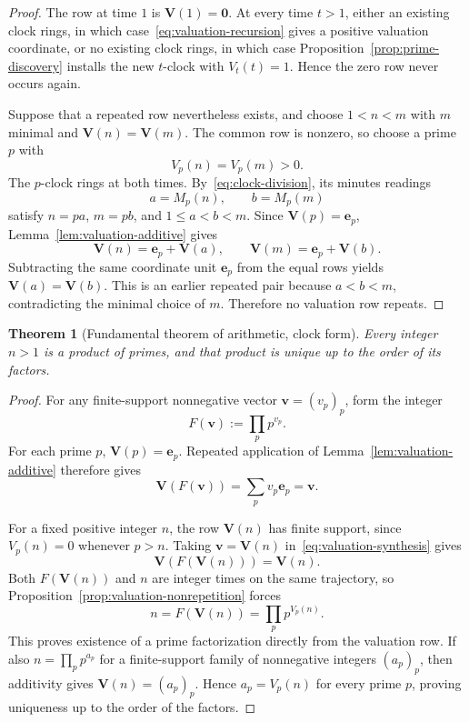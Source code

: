 \documentclass[11pt,a4paper]{article}
\theoremstyle{clockplain}
\newtheorem{theorem}[proposition]{Theorem}
\theoremstyle{definition}
\theoremstyle{remark}
\newcommand{\V}{\mathbf V}
\begin{document}
\begin{proof}
The row at time $1$ is $\V(1)=\mathbf0$. At every time $t>1$, either an existing clock rings, in which case~\eqref{eq:valuation-recursion} gives a positive valuation coordinate, or no existing clock rings, in which case Proposition~\ref{prop:prime-discovery} installs the new $t$-clock with $V_t(t)=1$. Hence the zero row never occurs again.

Suppose that a repeated row nevertheless exists, and choose $1<n<m$ with $m$ minimal and $\V(n)=\V(m)$. The common row is nonzero, so choose a prime $p$ with
\[
V_p(n)=V_p(m)>0.
\]
The $p$-clock rings at both times. By~\eqref{eq:clock-division}, its minutes readings
\[
a=M_p(n),\qquad b=M_p(m)
\]
satisfy $n=pa$, $m=pb$, and $1\le a<b<m$. Since $\V(p)=\mathbf e_p$, Lemma~\ref{lem:valuation-additive} gives
\[
\V(n)=\mathbf e_p+\V(a),
\qquad
\V(m)=\mathbf e_p+\V(b).
\]
Subtracting the same coordinate unit $\mathbf e_p$ from the equal rows yields $\V(a)=\V(b)$. This is an earlier repeated pair because $a<b<m$, contradicting the minimal choice of $m$. Therefore no valuation row repeats.
\end{proof}

\begin{theorem}[Fundamental theorem of arithmetic, clock form]
\label{prop:clock-fta}
Every integer $n>1$ is a product of primes, and that product is unique up to the order of its factors.
\end{theorem}

\begin{proof}
For any finite-support nonnegative vector $\mathbf v=(v_p)_p$, form the integer
\[
F(\mathbf v):=\prod_p p^{v_p}.
\]
For each prime $p$, $\V(p)=\mathbf e_p$. Repeated application of Lemma~\ref{lem:valuation-additive} therefore gives
\begin{equation}
\V(F(\mathbf v))=\sum_p v_p\mathbf e_p=\mathbf v.
\label{eq:valuation-synthesis}
\end{equation}

For a fixed positive integer $n$, the row $\V(n)$ has finite support, since $V_p(n)=0$ whenever $p>n$. Taking $\mathbf v=\V(n)$ in~\eqref{eq:valuation-synthesis} gives
\[
\V(F(\V(n)))=\V(n).
\]
Both $F(\V(n))$ and $n$ are integer times on the same trajectory, so Proposition~\ref{prop:valuation-nonrepetition} forces
\[
n=F(\V(n))=\prod_p p^{V_p(n)}.
\]
This proves existence of a prime factorization directly from the valuation row. If also $n=\prod_p p^{a_p}$ for a finite-support family of nonnegative integers $(a_p)_p$, then additivity gives $\V(n)=(a_p)_p$. Hence $a_p=V_p(n)$ for every prime $p$, proving uniqueness up to the order of the factors.
\end{proof}
\end{document}
